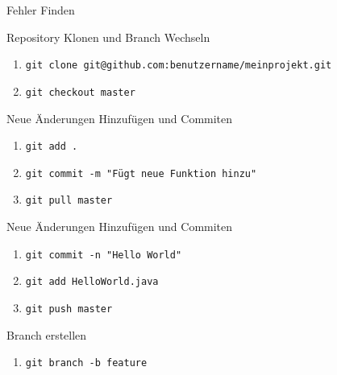 \documentclass[
    english, accentcolor=TUDa-1c,
    fontsize= 12pt, a4paper, aspectratio=169, colorback=true, fancy_row_colors, boxarc=3pt,
]{algoexercise}
\begin{document}
    \begin{task}{Fehler Finden}

        \begin{subtask*}{Repository Klonen und Branch Wechseln}
            \begin{enumerate}
                \item \texttt{git clone git@github.com:benutzername/meinprojekt.git}
                \item \texttt{git checkout master}
            \end{enumerate}
        \end{subtask*}

        \begin{subtask*}{Neue Änderungen Hinzufügen und Commiten}
            \begin{enumerate}
                \item \texttt{git add .}
                \item \texttt{git commit -m "Fügt neue Funktion hinzu"}
                \item \texttt{git pull master}
            \end{enumerate}
        \end{subtask*}

        \begin{subtask*}{Neue Änderungen Hinzufügen und Commiten}
            \begin{enumerate}
                \item \texttt{git commit -n "Hello World"}
                \item \texttt{git add HelloWorld.java}
                \item \texttt{git push master}
            \end{enumerate}
        \end{subtask*}

        \begin{subtask*}{Branch erstellen}
            \begin{enumerate}
                \item \texttt{git branch -b feature}
            \end{enumerate}
        \end{subtask*}
    \end{task}
\end{document}
